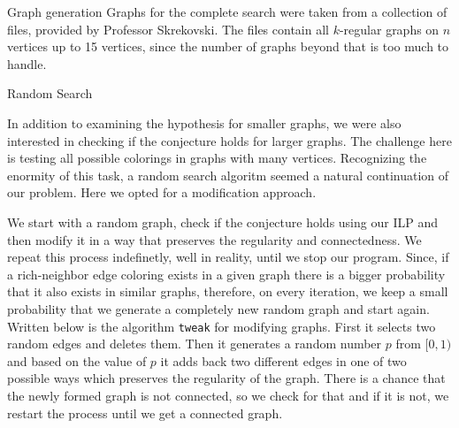 \documentclass[12pt,a4paper]{amsart}
\makeatletter
\renewcommand\section{\@startsection{section}{1}
  \z@{.5\linespacing\@plus.7\linespacing}{.5\linespacing}
  {\normalfont\scshape\large\centering}}
\renewcommand\subsection{\@startsection{subsection}{2}
  \z@{.5\linespacing\@plus.7\linespacing}{.5\linespacing}
  {\normalfont\scshape}}
\theoremstyle{definition} %
\theoremstyle{plain} %
\makeatother
\begin{document}
    \subsection{Graph generation}
        Graphs for the complete search were taken from a collection of files, provided by Professor Skrekovski. The files contain all $k$-regular graphs on $n$ vertices up to 15 vertices, since the number of graphs beyond that is too much to handle.

\section{Random Search}

    In addition to examining the hypothesis for smaller graphs, we were also interested in checking if the conjecture holds for larger graphs. The challenge here is testing all possible colorings in graphs with many vertices.
    Recognizing the enormity of this task, a random search algoritm seemed a natural continuation of our problem. Here we opted for a modification approach.

    We start with a random graph, check if the conjecture holds using our ILP and then modify it in a way that preserves the regularity and connectedness. We repeat this process indefinetly, well in reality, until we stop our program. Since, if a rich-neighbor edge coloring exists in a given graph there is a bigger probability that it also exists in similar graphs, therefore, on every iteration, we keep a small probability that we generate a completely new random graph and start again.\\

    Written below is the algorithm \texttt{tweak} for modifying graphs. First it selects two random edges and deletes them. Then it generates a random number $p$ from $[0, 1)$ and based on the value of $p$ it adds back two different edges in one of two possible ways which preserves the regularity of the graph. There is a chance that the newly formed graph is not connected, so we check for that and if it is not, we restart the process until we get a connected graph.\\
    
\end{document}
